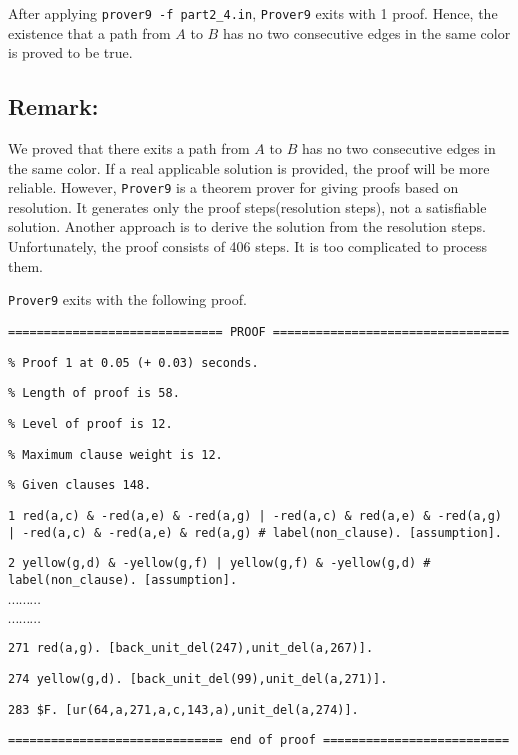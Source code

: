 \vspace{2mm}

After applying {\tt prover9 -f part2\_4.in}, {\tt Prover9} exits with 1 proof. Hence, the existence that a path from $A$ to $B$ has no two consecutive edges in the same color is proved to be true.

\subsection*{Remark:}
We proved that there exits a path from $A$ to $B$ has no two consecutive edges in the same color. If a real applicable solution is provided, the proof will be more reliable. However, {\tt Prover9} is a theorem prover for giving proofs based on resolution. It generates only the proof steps(resolution steps), not a satisfiable solution. Another approach is to derive the solution from the resolution steps. Unfortunately, the proof consists of 406 steps. It is too complicated to process them.

{\tt Prover9} exits with the following proof.

\vspace{3mm}

{\footnotesize

{\tt ============================== PROOF =================================}

{\tt \% Proof 1 at 0.05 (+ 0.03) seconds.}

{\tt \% Length of proof is 58.}

{\tt \% Level of proof is 12.}

{\tt \% Maximum clause weight is 12.}

{\tt \% Given clauses 148.}

{\tt 1 red(a,c) \& -red(a,e) \& -red(a,g) | -red(a,c) \& red(a,e) \& -red(a,g) | -red(a,c) \& -red(a,e) \& red(a,g) \# label(non\_clause).  [assumption]. }

{\tt 2 yellow(g,d) \& -yellow(g,f) | yellow(g,f) \& -yellow(g,d) \# label(non\_clause).  [assumption].}

$\cdots \cdots \cdots$

$\cdots \cdots \cdots$

{\tt 271 red(a,g).  [back\_unit\_del(247),unit\_del(a,267)].}

{\tt 274 yellow(g,d).  [back\_unit\_del(99),unit\_del(a,271)].}

{\tt 283 \$F.  [ur(64,a,271,a,c,143,a),unit\_del(a,274)].}

{\tt ============================== end of proof ==========================}

}

